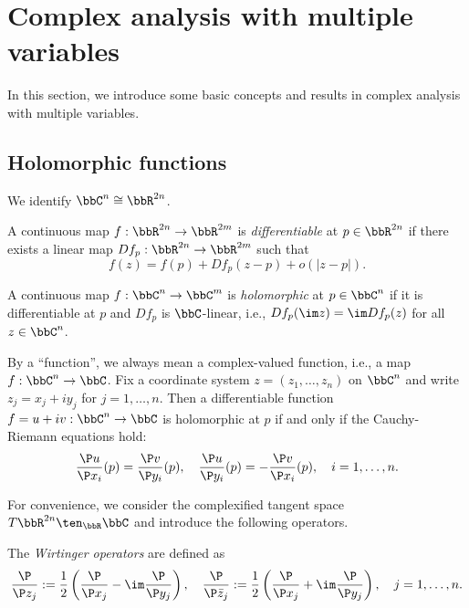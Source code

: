 \section{Complex analysis with multiple variables}

In this section, we introduce some basic concepts and results in complex analysis with multiple variables.

\subsection{Holomorphic functions}

    We identify \(\bbC^n \cong \bbR^{2n}\).

    \begin{definition}\label{def:differentiable_and_holomorphic_map}
        A continuous map \(f: \bbR^{2n} \to \bbR^{2m}\) is \emph{differentiable} at \(p \in \bbR^{2n}\) if there exists a linear map \(Df_p: \bbR^{2n} \to \bbR^{2m}\) such that 
        \[ f(z) = f(p) + Df_p(z - p) + o(|z - p|). \]

        A continuous map \(f: \bbC^n \to \bbC^m\) is \emph{holomorphic} at \(p \in \bbC^n\) if it is differentiable at \(p\) and \(Df_p\) is \(\bbC\)-linear, i.e., \(Df_p(\im z) = \im Df_p(z)\) for all \(z \in \bbC^n\).
    \end{definition}

    By a ``function'', we always mean a complex-valued function, i.e., a map \(f: \bbC^n \to \bbC\).
    Fix a coordinate system \(z = (z_1, \ldots, z_n)\) on \(\bbC^n\) and write \(z_j = x_j + iy_j\) for \(j = 1, \ldots, n\).
    Then a differentiable function \(f = u+iv: \bbC^n \to \bbC\) is holomorphic at \(p\) if and only if the Cauchy-Riemann equations hold:
    \[ \frac{\P u}{\P x_i}(p) = \frac{\P v}{\P y_i}(p), \quad \frac{\P u}{\P y_i}(p) = -\frac{\P v}{\P x_i}(p), \quad i = 1, \ldots, n. \]
    
    For convenience, we consider the complexified tangent space \(T\bbR^{2n} \ten_\bbR \bbC\) and introduce the following operators.

    \begin{definition}\label{def:Wirtinger_operators}
        The \emph{Wirtinger operators} are defined as 
        \[ \frac{\P}{\P z_j} := \frac{1}{2} \left( \frac{\P}{\P x_j} - \im \frac{\P}{\P y_j} \right), \quad \frac{\P}{\P \bar{z}_j} := \frac{1}{2} \left( \frac{\P}{\P x_j} + \im \frac{\P}{\P y_j} \right), \quad j = 1, \ldots, n. \]
    \end{definition}

